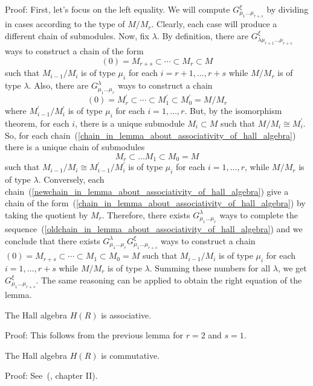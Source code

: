 Proof: First, let's focus on the left equality. We will compute $G_{\mu_1\dots\mu_{r+s}}^\xi$ by dividing in cases according to the type of $M/M_r$. Clearly, each case will produce a different chain of submodules. Now, fix $\lambda$. By definition, there are $G_{\lambda\mu_{r+1}\dots\mu_{r+s}}^\xi$ ways to construct a chain of the form
\begin{equation}\label{oldchain_in_lemma_about_associativity_of_hall_algebra}
    (0)=M_{r+s}\subset \cdots\subset M_r\subset M
\end{equation}
such that $M_{i-1}/M_i$ is of type $\mu_i$ for each $i=r+1,\dots,r+s$ while $M/M_r$ is of type $\lambda$. Also, there are $G_{\mu_1\dots\mu_r}^\lambda$ ways to construct a chain
\begin{equation}\label{chain_in_lemma_about_associativity_of_hall_algebra}
    (0) = M_r^\prime \subset\cdots\subset M_1^\prime\subset M_0^\prime=M/M_r
\end{equation}
where $M_{i-1}^\prime/M_i^\prime$ is of type $\mu_i$ for each $i=1,\dots,r$. But, by the isomorphism theorem, for each $i$, there is a unique submodule $M_i\subset M$ such that $M/M_i\cong  M_i^\prime$. So, for each chain~(\ref{chain_in_lemma_about_associativity_of_hall_algebra}) there is a unique chain of submodules
\begin{equation}\label{newchain_in_lemma_about_associativity_of_hall_algebra}
    M_r\subset \dots M_1\subset M_0=M
\end{equation}
such that $M_{i-1}/M_i\cong M_{i-1}^\prime/M_i^\prime$ is of type $\mu_i$ for each $i=1,\dots,r$, while $M/M_r$ is of type $\lambda$. Conversely, each chain~(\ref{newchain_in_lemma_about_associativity_of_hall_algebra}) give a chain of the form~(\ref{chain_in_lemma_about_associativity_of_hall_algebra}) by taking the quotient by $M_r$. Therefore, there exists $G_{\mu_1\dots\mu_r}^\lambda$ ways to complete the sequence~(\ref{oldchain_in_lemma_about_associativity_of_hall_algebra}) and we conclude that there exists $G_{\mu_1\dots\mu_r}^\lambda G_{\mu_1\dots\mu_{r+s}}^\xi$ ways to construct a chain $(0)=M_{r+s}\subset\cdots\subset M_1\subset M_0=M$ such that $M_{i-1}/M_i$ is of type $\mu_i$ for each $i=1,\dots,r+s$ while $M/M_r$ is of type $\lambda$. Summing these numbers for all $\lambda$, we get $G_{\mu_1\dots\mu_{r+s}}^\xi$. The same reasoning can be applied to obtain the right equation of the lemma.
\begin{dang}
    \begin{theorem}\cite{macdonald1998symmetric}
          The Hall algebra $H(R)$ is associative.
    \end{theorem}
\end{dang}
Proof: This follows from the previous lemma for $r=2$ and $s=1$.
\begin{dang}
    \begin{theorem}\cite{macdonald1998symmetric}
        The Hall algebra $H(R)$ is commutative.
    \end{theorem}
\end{dang}
Proof: See~(\cite{macdonald1998symmetric}, chapter II).


